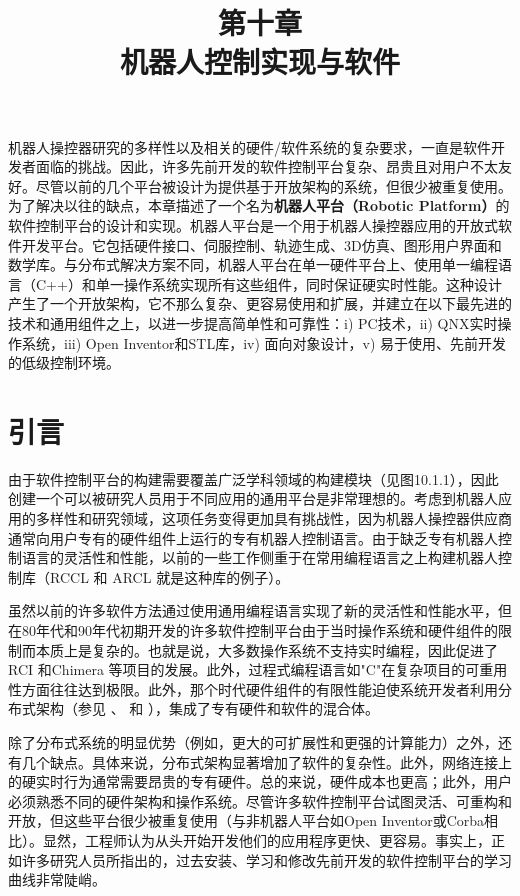 \documentclass[UTF8,a4paper,12pt]{ctexart}
\title{\textbf{第十章} \\ \vspace{0.5cm} 机器人控制实现与软件}
\author{}
\date{}
\begin{document}
\maketitle

机器人操控器研究的多样性以及相关的硬件/软件系统的复杂要求，一直是软件开发者面临的挑战。因此，许多先前开发的软件控制平台复杂、昂贵且对用户不太友好。尽管以前的几个平台被设计为提供基于开放架构的系统，但很少被重复使用。为了解决以往的缺点，本章描述了一个名为\textbf{机器人平台（Robotic Platform）}的软件控制平台的设计和实现。机器人平台是一个用于机器人操控器应用的开放式软件开发平台。它包括硬件接口、伺服控制、轨迹生成、3D仿真、图形用户界面和数学库。与分布式解决方案不同，机器人平台在单一硬件平台上、使用单一编程语言（C++）和单一操作系统实现所有这些组件，同时保证硬实时性能。这种设计产生了一个开放架构，它不那么复杂、更容易使用和扩展，并建立在以下最先进的技术和通用组件之上，以进一步提高简单性和可靠性：i) PC技术，ii) QNX实时操作系统，iii) Open Inventor和STL库，iv) 面向对象设计，v) 易于使用、先前开发的低级控制环境。

\section{引言}

由于软件控制平台的构建需要覆盖广泛学科领域的构建模块（见图10.1.1），因此创建一个可以被研究人员用于不同应用的通用平台是非常理想的。考虑到机器人应用的多样性和研究领域，这项任务变得更加具有挑战性，因为机器人操控器供应商通常向用户专有的硬件组件上运行的专有机器人控制语言。由于缺乏专有机器人控制语言的灵活性和性能，以前的一些工作侧重于在常用编程语言之上构建机器人控制库（RCCL \cite{Lloyd1988} 和 ARCL \cite{Corke} 就是这种库的例子）。

虽然以前的许多软件方法通过使用通用编程语言实现了新的灵活性和性能水平，但在80年代和90年代初期开发的许多软件控制平台由于当时操作系统和硬件组件的限制而本质上是复杂的。也就是说，大多数操作系统不支持实时编程，因此促进了RCI \cite{Lloyd1990} 和Chimera \cite{Stewart1989} 等项目的发展。此外，过程式编程语言如"C"在复杂项目的可重用性方面往往达到极限。此外，那个时代硬件组件的有限性能迫使系统开发者利用分布式架构（参见 \cite{Miller1991}、\cite{Kapoor1996} 和 \cite{Pelich1996}），集成了专有硬件和软件的混合体。

除了分布式系统的明显优势（例如，更大的可扩展性和更强的计算能力）之外，还有几个缺点。具体来说，分布式架构显著增加了软件的复杂性。此外，网络连接上的硬实时行为通常需要昂贵的专有硬件。总的来说，硬件成本也更高；此外，用户必须熟悉不同的硬件架构和操作系统。尽管许多软件控制平台试图灵活、可重构和开放，但这些平台很少被重复使用（与非机器人平台如Open Inventor或Corba相比）。显然，工程师认为从头开始开发他们的应用程序更快、更容易。事实上，正如许多研究人员所指出的，过去安装、学习和修改先前开发的软件控制平台的学习曲线非常陡峭。
\end{document}
